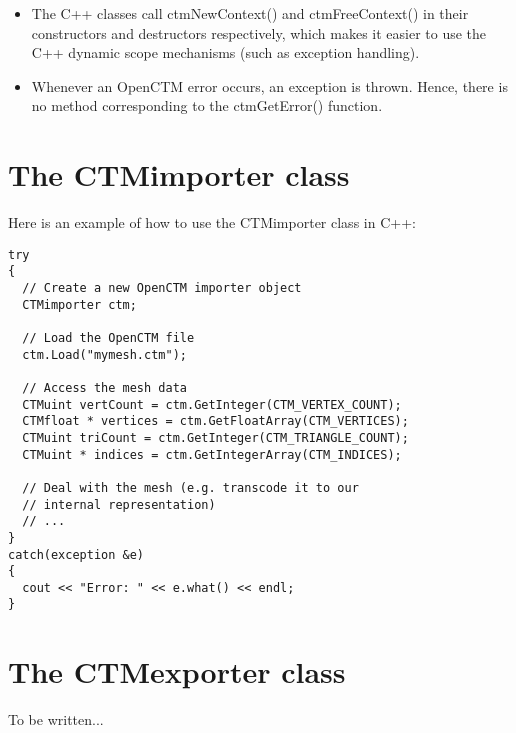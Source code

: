 \begin{itemize}
    \item The C++ classes call ctmNewContext() and ctmFreeContext() in their
          constructors and destructors respectively, which makes it easier to
          use the C++ dynamic scope mechanisms (such as exception handling).
    \item Whenever an OpenCTM error occurs, an exception is thrown. Hence, there
          is no method corresponding to the ctmGetError() function.
\end{itemize}

\section{The CTMimporter class}

Here is an example of how to use the CTMimporter class in C++:

\begin{lstlisting}
try
{
  // Create a new OpenCTM importer object
  CTMimporter ctm;

  // Load the OpenCTM file
  ctm.Load("mymesh.ctm");

  // Access the mesh data
  CTMuint vertCount = ctm.GetInteger(CTM_VERTEX_COUNT);
  CTMfloat * vertices = ctm.GetFloatArray(CTM_VERTICES);
  CTMuint triCount = ctm.GetInteger(CTM_TRIANGLE_COUNT);
  CTMuint * indices = ctm.GetIntegerArray(CTM_INDICES);

  // Deal with the mesh (e.g. transcode it to our
  // internal representation)
  // ...
}
catch(exception &e)
{
  cout << "Error: " << e.what() << endl;
}
\end{lstlisting}


\section{The CTMexporter class}
To be written...




